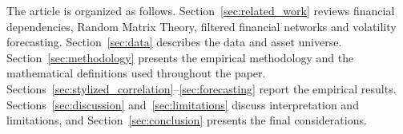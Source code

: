 The article is organized as follows. Section~\ref{sec:related_work} reviews financial dependencies, Random Matrix Theory, filtered financial networks and volatility forecasting. Section~\ref{sec:data} describes the data and asset universe. Section~\ref{sec:methodology} presents the empirical methodology and the mathematical definitions used throughout the paper. Sections~\ref{sec:stylized_correlation}--\ref{sec:forecasting} report the empirical results. Sections~\ref{sec:discussion} and~\ref{sec:limitations} discuss interpretation and limitations, and Section~\ref{sec:conclusion} presents the final considerations.
